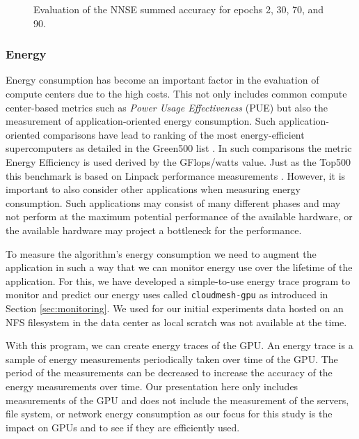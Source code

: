 \documentclass[utf8]{FrontiersinVancouver} %
\begin{document}
\begin{figure}[p]
\begin{center}
  \end{center}

  \caption {Evaluation of the NNSE summed accuracy for epochs 2, 30, 70, and 90.}
  \label{fig:NNSE-comparison-a100-summed}

\end{figure}

\subsubsection{Energy}
\label{sec:perf-energy}


Energy consumption has become an important factor in the evaluation of
compute centers due to the high costs. This not only includes common
compute center-based metrics such as {\em Power Usage Effectiveness}
(PUE) but also the measurement of application-oriented energy
consumption.  Such application-oriented comparisons have lead to
ranking of the most energy-efficient supercomputers as detailed in the
Green500 list \citep{green500}. In such comparisons the metric Energy
Efficiency is used derived by the GFlops/watts value. Just as the
Top500 this benchmark is based on Linpack performance measurements
\cite{www-top500}.  However, it is important to also consider other
applications when measuring energy consumption. Such applications may
consist of many different phases and may not perform at the maximum
potential performance of the available hardware, or the available
hardware may project a bottleneck for the performance.

To measure the algorithm's energy consumption we need to augment the
application in such a way that we can monitor energy use over the
lifetime of the application. For this, we have developed a
simple-to-use energy trace program to monitor and predict our energy
uses called \verb|cloudmesh-gpu| as introduced in Section
\ref{sec:monitoring}.  We used for our initial experiments data hosted
on an NFS filesystem in the data center as local scratch was not
available at the time.


With this program, we can create energy traces of the GPU. An energy
trace is a sample of energy measurements periodically taken over time
of the GPU. The period of the measurements can be decreased to
increase the accuracy of the energy measurements over time. Our
presentation here only includes measurements of the GPU and does not
include the measurement of the servers, file system, or network energy
consumption as our focus for this study is the impact on GPUs and to
see if they are efficiently used.
\end{document}
